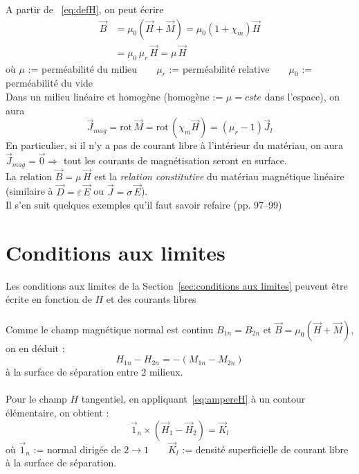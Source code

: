 \documentclass	[11pt, a4paper, openany]{book}
\newcommand{\E}{\vec E}
\newcommand{\rot}{\text{rot}\,}
\begin{document}
A partir de ~\eqref{eq:defH}, on peut écrire
\begin{align}
\vec B & =\mu_0\left(\vec H+\vec M\right)=\mu_0(1+\chi_m)\vec H\\
& =\mu_0\,\mu_r\,\vec H=\mu\,\vec H
\end{align}
où $\mu$ := perméabilité du milieu$\qquad\mu_r$ := perméabilité relative$\qquad\mu_0$ := perméabilité du vide\\

Dans un milieu linéaire et homogène (homogène := $\mu=cste$ dans l'espace), on aura 
\begin{equation}
\vec J_{mag}=\rot\vec M=\rot\left(\chi_m\vec H\right)=(\mu_r-1)\vec J_{l}
\end{equation}
En particulier, si il n'y a pas de courant libre à l'intérieur du matériau, on aura $\vec J_{mag}=\vec{0}\Rightarrow$ tout les courants de magnétisation seront en surface.\\

La relation $\vec B=\mu\,\vec H$ est la \textit{relation constitutive} du matériau magnétique linéaire (similaire à $\vec D=\varepsilon\,\vec E$ ou $\vec J=\sigma\,\E$).\\

Il s'en suit quelques exemples qu'il faut savoir refaire (pp. 97--99)
\setcounter{section}{4}
\section{Conditions aux limites}\label{sec:conditions aux limites (magnétisme)}
Les conditions aux limites de la Section~\ref{sec:conditions aux limites} peuvent être écrite en fonction de $H$ et des courants libres\\\\
Comme le champ magnétique normal est continu $B_{1n}=B_{2n}$ et $\vec B=\mu_0\left(\vec H+\vec M\right)$, on en déduit :
\begin{equation}
H_{1n}-H_{2n}=-(M_{1n}-M_{2n})
\end{equation}
à la surface de séparation entre 2 milieux.\\\\
Pour le champ $H$ tangentiel, en appliquant~\eqref{eq:ampereH} à un contour élémentaire, on obtient : 
\begin{equation}
\vec 1_n\times\left(\vec H_1-\vec H_2\right)=\vec K_{l}
\end{equation}
où $\vec 1_n$ := normal dirigée de $2\rightarrow 1\qquad\vec K_{l}$ := densité superficielle de courant libre à la surface de séparation.\\
\end{document}
